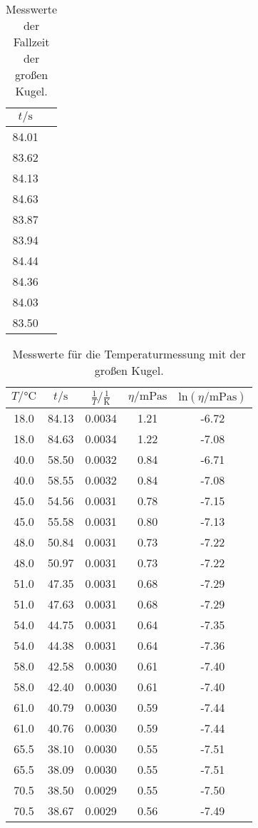 \begin{table}[h]
  \centering
  \caption{Messwerte der Fallzeit der großen Kugel.}
  \label{tab:grKugel}
  \begin{tabular}{c c}
    \toprule
    $t/\si{\second}$ \\
    \midrule
    84.01 \\
    83.62 \\
    84.13 \\
    84.63 \\
    83.87 \\
    83.94 \\
    84.44 \\
    84.36 \\
    84.03 \\
    83.50 \\
    \bottomrule
  \end{tabular}
\end{table}

\begin{table}[h]
  \centering
  \caption{Messwerte für die Temperaturmessung mit der großen Kugel.}
  \label{tab:FallTemp}
  \begin{tabular}{c c c c c}
    \toprule
    $T/\si{\celsius}$ & $t/\si{\second}$ & $\frac{1}{T}/\frac{1}{\si{\kelvin}}$
    & $\eta/\si{\milli\pascal\second}$ &
    $\text{ln}(\eta/\si{\milli\pascal\second})$ \\
    \midrule
    18.0 & 84.13 & 0.0034 & 1.21 & -6.72 \\
    18.0 & 84.63 & 0.0034 & 1.22 & -7.08 \\
    40.0 & 58.50 & 0.0032 & 0.84 & -6.71 \\
    40.0 & 58.55 & 0.0032 & 0.84 & -7.08 \\
    45.0 & 54.56 & 0.0031 & 0.78 & -7.15 \\
    45.0 & 55.58 & 0.0031 & 0.80 & -7.13 \\
    48.0 & 50.84 & 0.0031 & 0.73 & -7.22 \\
    48.0 & 50.97 & 0.0031 & 0.73 & -7.22 \\
    51.0 & 47.35 & 0.0031 & 0.68 & -7.29 \\
    51.0 & 47.63 & 0.0031 & 0.68 & -7.29 \\
    54.0 & 44.75 & 0.0031 & 0.64 & -7.35 \\
    54.0 & 44.38 & 0.0031 & 0.64 & -7.36 \\
    58.0 & 42.58 & 0.0030 & 0.61 & -7.40 \\
    58.0 & 42.40 & 0.0030 & 0.61 & -7.40 \\
    61.0 & 40.79 & 0.0030 & 0.59 & -7.44 \\
    61.0 & 40.76 & 0.0030 & 0.59 & -7.44 \\
    65.5 & 38.10 & 0.0030 & 0.55 & -7.51 \\
    65.5 & 38.09 & 0.0030 & 0.55 & -7.51 \\
    70.5 & 38.50 & 0.0029 & 0.55 & -7.50 \\
    70.5 & 38.67 & 0.0029 & 0.56 & -7.49 \\
    \bottomrule
  \end{tabular}

\end{table}


